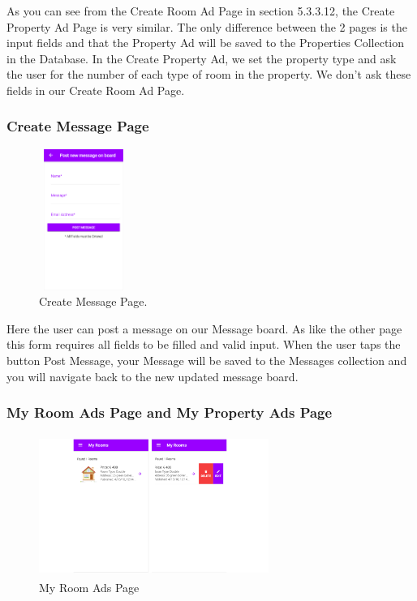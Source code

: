 As you can see from the Create Room Ad Page in section 5.3.3.12, the Create Property Ad Page is very similar. The only difference between the 2 pages is the input fields and that the Property Ad will be saved to the Properties Collection in the Database. In the Create Property Ad, we set the property type and ask the user for the number of each type of room in the property. We don’t ask these fields in our Create Room Ad Page.

\subsubsection{Create Message Page}

\begin{figure}[h]
\centering
\includegraphics[width=2.9cm, height=4.6cm]{img/CreateMessage}
\caption{Create Message Page.}
\end{figure}

\noindent Here the user can post a message on our Message board. As like the other page this form requires all fields to be filled and valid input. When the user taps the button Post Message, your Message will be saved to the Messages collection and you will navigate back to the new updated message board.
    
\subsubsection{My Room Ads Page and My Property Ads Page}

\begin{figure}[h]
\centering
\includegraphics[width=7.5cm, height=4.6cm]{img/myAds}
\caption{My Room Ads Page}
\end{figure}  

